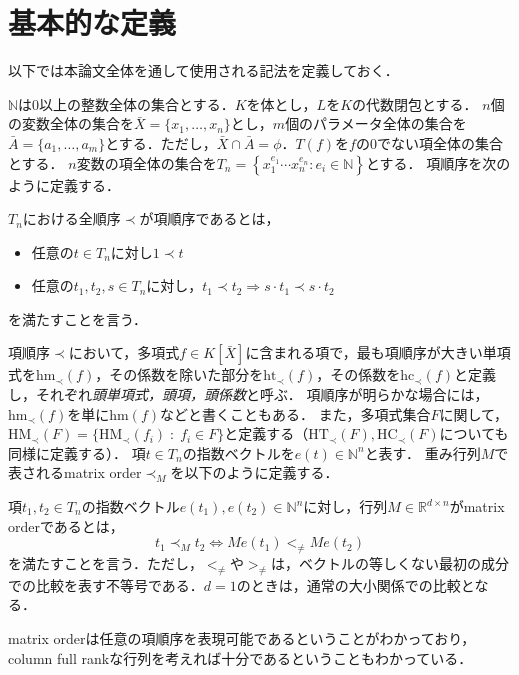 \section{基本的な定義}
以下では本論文全体を通して使用される記法を定義しておく．
\par
$\mathbb{N}$は$0$以上の整数全体の集合とする．$K$を体とし，$L$を$K$の代数閉包とする．
$n$個の変数全体の集合を$\bar{X} = \{x_1, \dots, x_n\}$とし，$m$個のパラメータ全体の集合を$\bar{A} = \{a_1, \dots, a_m\}$とする．ただし，$\bar{X}\cap \bar{A} = \phi$．$T(f)$を$f$の$0$でない項全体の集合とする．
$n$変数の項全体の集合を$T_n = \left\{ x_1^{e_1} \cdots x_n^{e_n} : e_i \in \mathbb{N} \right\}$とする．
項順序を次のように定義する．
\begin{definition}[項順序]
	$T_n$における全順序$\prec$が項順序であるとは，
	\begin{itemize}
		\item 任意の$t \in T_n$に対し$1 \prec t$
		\item 任意の$t_1, t_2, s \in T_n$に対し，$t_1 \prec t_2 \Longrightarrow s\cdot t_1 \prec s\cdot t_2$
	\end{itemize}
	を満たすことを言う．
\end{definition}
項順序$\prec$において，多項式$f\in K[\bar{X}]$に含まれる項で，最も項順序が大きい単項式を$\mathrm{hm}_{\prec}(f)$，その係数を除いた部分を$\mathrm{ht}_{\prec}(f)$，その係数を$\mathrm{hc}_{\prec}(f)$と定義し，それぞれ\emph{頭単項式，頭項，頭係数}と呼ぶ．
項順序が明らかな場合には，$\mathrm{hm}_{\prec}(f)$を単に$\mathrm{hm}(f)$などと書くこともある．
また，多項式集合$F$に関して，$\mathrm{HM}_{\prec}(F) = \{ \mathrm{HM}_{\prec}(f_i) \;:\; f_i \in F \}$と定義する（$\mathrm{HT}_{\prec}(F), \mathrm{HC}_{\prec}(F)$についても同様に定義する）．
項$t \in T_n$の指数ベクトルを$e(t) \in \mathbb{N}^{n}$と表す．
重み行列$M$で表されるmatrix order$\prec_M$を以下のように定義する．
\begin{definition}
	項$t_1, t_2 \in T_n$の指数ベクトル$e(t_1), e(t_2) \in \mathbb{N}^{n}$に対し，行列$M \in \mathbb{R}^{d\times n}$がmatrix orderであるとは，
	$$t_1 \prec_M t_2 \Longleftrightarrow Me(t_1) <_{\ne} Me(t_2)$$
	を満たすことを言う．ただし，$<_{\ne}$や$>_{\ne}$は，ベクトルの等しくない最初の成分での比較を表す不等号である．$d=1$のときは，通常の大小関係での比較となる．
\end{definition}
matrix orderは任意の項順序を表現可能である\cite{MR826583}ということがわかっており，column full rankな行列を考えれば十分であるということもわかっている．
\par
